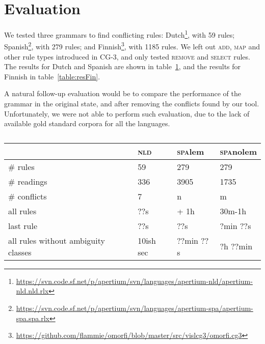 \section{Evaluation}
\label{sec:eval}

We tested three grammars to find conflicting rules: 
Dutch\footnote{\url{https://svn.code.sf.net/p/apertium/svn/languages/apertium-nld/apertium-nld.nld.rlx}},
with 59 rules; 
Spanish\footnote{\url{https://svn.code.sf.net/p/apertium/svn/languages/apertium-spa/apertium-spa.spa.rlx}},
with 279 rules; and 
Finnish\footnote{\url{https://github.com/flammie/omorfi/blob/master/src/vislcg3/omorfi.cg3}},
with 1185 rules. We left out \textsc{add}, \textsc{map} and other rule
types introduced in CG-3, and only tested \textsc{remove} and \textsc{select} rules.
The results for Dutch and Spanish are shown in table~\ref{table:res},
and the results for Finnish in table~\ref{table:resFin}.

A natural follow-up evaluation would be to compare the performance of the
grammar in the original state, and after removing the conflicts found
by our tool. Unfortunately, we were not able to perform such
evaluation, due to the lack of available gold standard corpora for all
the languages.


\begin{table}[]
\centering
\begin{tabular}{|l|l|l|l|}

\hline
                   & \textsc{nld}  & \textsc{spa}lem  & \textsc{spa}nolem \\ \hline
\# rules           & 59            & 279       & 279     \\ \hline
\# readings        & 336           & 3905      & 1735    \\ \hline
\# conflicts       & 7             & n         & m    \\ \hline
\clock{} all rules & ??s           & + 1h      & 30m-1h   \\ \hline
\clock{} last rule & ??s           & ??s       & ?min ??s    \\ \hline
\clock{} all rules 
without ambiguity 
classes            & 10ish sec       & ??min ??s    & ?h ??min    \\ \hline


\end{tabular}
\caption{}
\label{table:res}
\end{table}

